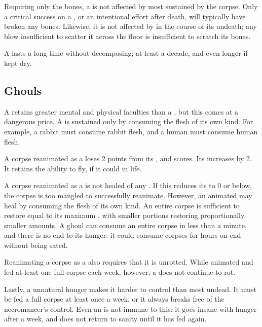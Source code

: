 Requiring only the bones, a  is not affected by most {\damage} sustained by the corpse.
Only a critical success on a {\damagetest}, or an intentional effort after death, will typically have broken any bones.
Likewise, it is not affected by {\damage} in the course of its undeath; any blow insufficient to scatter it across the floor is insufficient to scratch its bones.

A  lasts a long time without decomposing; at least a decade, and even longer if kept dry.

\subsection{Ghouls}

A  retains greater mental and physical faculties than a , but this comes at a dangerous price.
A  is sustained only by consuming the flesh of its own kind.
For example, a rabbit  must consume rabbit flesh, and a human  must consume human flesh.

A corpse reanimated as a  loses 2 points from its ,  and  scores.
Its  increases by 2.
It retains the ability to fly, if it could in life.

A corpse reanimated as a  is not healed of any {\damage}.
If this reduces its  to 0 or below, the corpse is too mangled to successfully reanimate.
However, an animated  may heal {\damage} by consuming the flesh of its own kind.
An entire corpse is sufficient to restore {\damage} equal to its maximum , with smaller portions restoring proportionally smaller amounts.
A ghoul can consume an entire corpse in less than a minute, and there is no end to its hunger: it could consume corpses for hours on end without being sated.

Reanimating a corpse as a  also requires that it is unrotted.
While animated and fed at least one full corpse each week, however, a  does not continue to rot.

Lastly, a  unnatural hunger makes it harder to control than most undead.
It must be fed a full corpse at least once a week, or it always breaks free of the necromancer's control.
Even an  is not immune to this: it goes insane with hunger after a week, and does not return to sanity until it has fed again.


